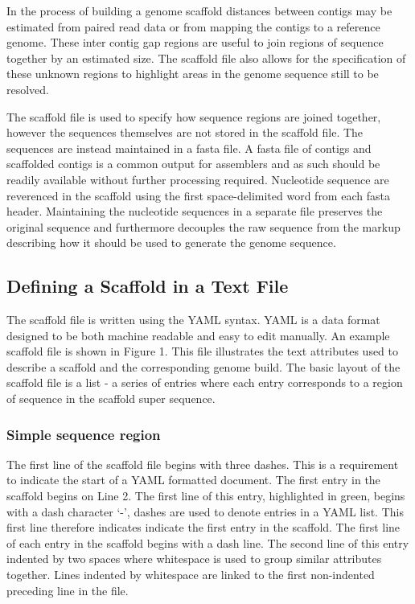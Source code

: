 \documentclass[10pt]{bmc_article}
\newenvironment{bmcformat}{\begin{raggedright}\baselineskip20pt\sloppy\setboolean{publ}{false}}{\end{raggedright}\baselineskip20pt\sloppy}
\begin{document}
\begin{bmcformat}
In the process of building a genome scaffold distances between contigs may be
estimated from paired read data or from mapping the contigs to a reference
genome. These inter contig gap regions are useful to join regions of sequence
together by an estimated size. The scaffold file also allows for the
specification of these unknown regions to highlight areas in the genome
sequence still to be resolved. \pb

The scaffold file is used to specify how sequence regions are joined together,
however the sequences themselves are not stored in the scaffold file. The
sequences are instead maintained in a fasta file. A fasta file of contigs and
scaffolded contigs is a common output for assemblers and as such should be
readily available without further processing required. Nucleotide sequence are
reverenced in the scaffold using the first space-delimited word from each fasta
header. Maintaining the nucleotide sequences in a separate file preserves the
original sequence and furthermore decouples the raw sequence from the markup
describing how it should be used to generate the genome sequence. \pb

\subsection*{Defining a Scaffold in a Text File} %

The scaffold file is written using the YAML syntax. YAML is a data format
designed to be both machine readable and easy to edit manually. An example
scaffold file is shown in Figure 1. This file illustrates the text attributes
used to describe a scaffold and the corresponding genome build. The basic
layout of the scaffold file is a list - a series of entries where each entry
corresponds to a region of sequence in the scaffold super sequence. \pb

\subsubsection*{Simple sequence region} %

The first line of the scaffold file begins with three dashes. This is
a requirement to indicate the start of a YAML formatted document. The first
entry in the scaffold begins on Line 2. The first line of this entry,
highlighted in green, begins with a dash character `-', dashes are used to
denote entries in a YAML list. This first line therefore indicates indicate
the first entry in the scaffold. The first line of each entry in the scaffold
begins with a dash line. The second line of this entry indented by two spaces
where whitespace is used to group similar attributes together. Lines indented
by whitespace are linked to the first non-indented preceding line in the file.
\pb


\end{bmcformat}
\end{document}
